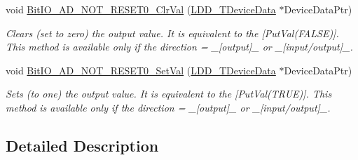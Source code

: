 \begin{DoxyCompactItemize}
void \hyperlink{group___bit_i_o___a_d___n_o_t___r_e_s_e_t0__module_gaefb268d1d1d49c8d51163da5d2b410b3}{Bit\-I\-O\-\_\-\-A\-D\-\_\-\-N\-O\-T\-\_\-\-R\-E\-S\-E\-T0\-\_\-\-Clr\-Val} (\hyperlink{group___p_e___types__module_gac5cf1362f1f0e3a2ce71b1bf2276d091}{L\-D\-D\-\_\-\-T\-Device\-Data} $\ast$Device\-Data\-Ptr)
\begin{DoxyCompactList}\small\item\em Clears (set to zero) the output value. It is equivalent to the \mbox{[}Put\-Val(\-F\-A\-L\-S\-E)\mbox{]}. This method is available only if the direction = \-\_\-\mbox{[}output\mbox{]}\-\_\- or \-\_\-\mbox{[}input/output\mbox{]}\-\_\-. \end{DoxyCompactList}\item 
void \hyperlink{group___bit_i_o___a_d___n_o_t___r_e_s_e_t0__module_ga3d566550ab250b5a4fdc2eafb56209bd}{Bit\-I\-O\-\_\-\-A\-D\-\_\-\-N\-O\-T\-\_\-\-R\-E\-S\-E\-T0\-\_\-\-Set\-Val} (\hyperlink{group___p_e___types__module_gac5cf1362f1f0e3a2ce71b1bf2276d091}{L\-D\-D\-\_\-\-T\-Device\-Data} $\ast$Device\-Data\-Ptr)
\begin{DoxyCompactList}\small\item\em Sets (to one) the output value. It is equivalent to the \mbox{[}Put\-Val(\-T\-R\-U\-E)\mbox{]}. This method is available only if the direction = \-\_\-\mbox{[}output\mbox{]}\-\_\- or \-\_\-\mbox{[}input/output\mbox{]}\-\_\-. \end{DoxyCompactList}\end{DoxyCompactItemize}


\subsection{Detailed Description}


